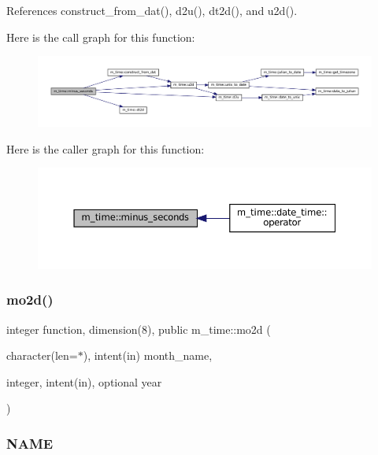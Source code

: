 References construct\+\_\+from\+\_\+dat(), d2u(), dt2d(), and u2d().

Here is the call graph for this function\+:\nopagebreak
\begin{figure}[H]
\begin{center}
\leavevmode
\includegraphics[width=350pt]{namespacem__time_a0d241cbb8f2e30a64b53f4aae4100709_cgraph}
\end{center}
\end{figure}
Here is the caller graph for this function\+:\nopagebreak
\begin{figure}[H]
\begin{center}
\leavevmode
\includegraphics[width=350pt]{namespacem__time_a0d241cbb8f2e30a64b53f4aae4100709_icgraph}
\end{center}
\end{figure}
\mbox{\label{namespacem__time_a8188c7ed4e592c4f2388d28c75486726}} 
\subsubsection{\texorpdfstring{mo2d()}{mo2d()}}
{\footnotesize\ttfamily integer function, dimension(8), public m\+\_\+time\+::mo2d (\begin{DoxyParamCaption}\item[{character(len=$\ast$), intent(in)}]{month\+\_\+name,  }\item[{integer, intent(in), optional}]{year }\end{DoxyParamCaption})}



\subsubsection*{N\+A\+ME}

